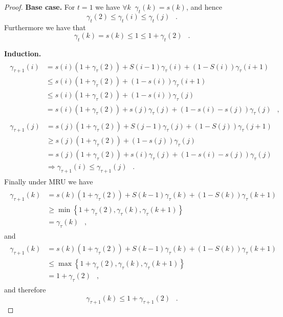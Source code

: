 \documentclass[11pt,a4paper]{article}
\DeclareMathOperator{\mf}{\enspace .}
\DeclareMathOperator{\mc}{\enspace ,}
\theoremstyle{definition}
\theoremstyle{remark}
\begin{document}
\begin{proof}
  \par{\bf Base case.}  For $t=1$ we have $\forall k \;\; \gamma_t(k)=s(k)$,
  and hence
  \begin{equation}
    \gamma_t(2)\leq\gamma_t(i)\leq\gamma_t(j) \mf
  \end{equation}
  Furthermore we have that
  \begin{equation}
    \gamma_t(k)=s(k)\leq 1\leq 1+\gamma_t(2) \mf
  \end{equation}
  \par{\bf Induction.}
  \begin{align}
    \begin{split}
      \gamma_{\tau+1}(i)&=s(i)(1+\gamma_{\tau}(2))+S(i-1)\gamma_{\tau}(i)+(1-S(i))\gamma_{\tau}(i+1)\\
      &\leq s(i)(1+\gamma_{\tau}(2))+(1-s(i))\gamma_{\tau}(i+1)\\
      &\leq s(i)(1+\gamma_{\tau}(2))+(1-s(i))\gamma_{\tau}(j)\\
      &=s(i)(1+\gamma_{\tau}(2))+s(j)\gamma_{\tau}(j)+(1-s(i)-s(j))\gamma_{\tau}(j) \mc
    \end{split}
  \end{align}
  \begin{align}
    \begin{split}
      \gamma_{\tau+1}(j)&=s(j)(1+\gamma_{\tau}(2))+S(j-1)\gamma_{\tau}(j)+(1-S(j))\gamma_{\tau}(j+1)\\
      &\geq s(j)(1+\gamma_{\tau}(2))+(1-s(j))\gamma_{\tau}(j)\\
      &=s(j)(1+\gamma_{\tau}(2))+s(i)\gamma_{\tau}(j)+(1-s(i)-s(j))\gamma_{\tau}(j)\\[5mm]
      &\Rightarrow \gamma_{\tau+1}(i)\leq\gamma_{\tau+1}(j) \mf
    \end{split}
  \end{align}
  Finally under MRU we have
  \begin{align}
    \begin{split}
      \gamma_{\tau+1}(k)&=s(k)(1+\gamma_{\tau}(2))
      +S(k-1)\gamma_{\tau}(k)+(1-S(k))\gamma_{\tau}(k+1)\\
      &\geq \min\left\{1+\gamma_{\tau}(2),\gamma_{\tau}(k),
        \gamma_{\tau}(k+1)\right\}\\&=\gamma_{\tau}(k) \mc
    \end{split}
  \end{align}
  and
  \begin{align}
    \begin{split}
      \gamma_{\tau+1}(k)&=s(k)(1+\gamma_{\tau}(2))+S(k-1)\gamma_{\tau}(k)+(1-S(k))\gamma_{\tau}(k+1)\\
      &\leq \max\left\{1+\gamma_{\tau}(2),\gamma_{\tau}(k),
        \gamma_{\tau}(k+1)\right\}\\&=1+\gamma_{\tau}(2) \mc
    \end{split}
  \end{align}
  and therefore
  \begin{equation}
    \gamma_{\tau+1}(k)\leq 1+\gamma_{\tau+1}(2) \mf
  \end{equation}
\end{proof}
\end{document}
